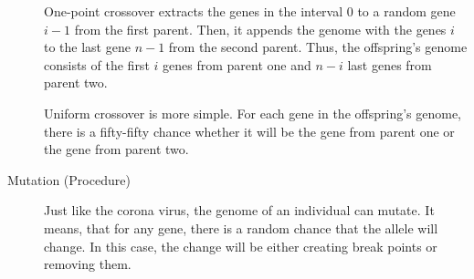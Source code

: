 \begin{description}
    One-point crossover extracts the genes in the interval $0$ to a random gene
    $i - 1$ from the first parent. Then, it appends the genome with the genes
    $i$ to the last gene $n - 1$ from the second parent. Thus, the offspring's
    genome consists of the first $i$ genes from parent one and $n-i$ last genes
    from parent two. 

    Uniform crossover is more simple. For each gene in the offspring's genome,
    there is a fifty-fifty chance whether it will be the gene from parent one or
    the gene from parent two. 

    \item[Mutation (Procedure)] Just like the corona virus, the genome of an
    individual can mutate. It means, that for any gene, there is a random chance
    that the allele will change. In this case, the change will be either
    creating break points or removing them. 

\end{description}
